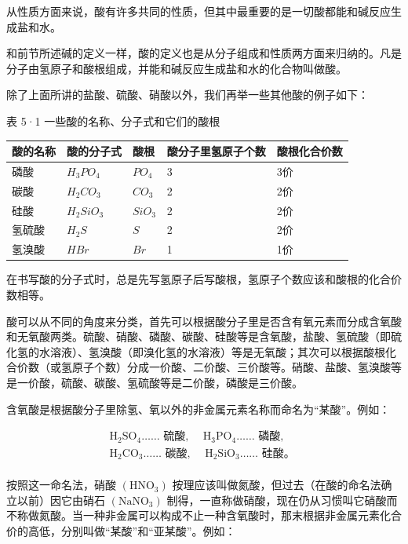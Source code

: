 从性质方面来说，酸有许多共同的性质，但其中最重要的是一切酸都能和碱反应生成盐和水。

和前节所述碱的定义一样，酸的定义也是从分子组成和性质两方面来归纳的。凡是分子由氢原子和酸根组成，并能和碱反应生成盐和水的化合物叫做酸。

除了上面所讲的盐酸、硫酸、硝酸以外，我们再举一些其他酸的例子如下：

表 5·1 一些酸的名称、分子式和它们的酸根

{\def\LTcaptype{none} %
\begin{longtable}[]{@{}lllll@{}}
\toprule\noalign{}
酸的名称 & 酸的分子式 & 酸根 & 酸分子里氢原子个数 & 酸根化合价数 \\
\midrule\noalign{}
\endhead
\bottomrule\noalign{}
\endlastfoot
磷酸 & \(H_3PO_4\) & \(PO_4\) & 3 & 3价 \\
碳酸 & \(H_2CO_3\) & \(CO_3\) & 2 & 2价 \\
硅酸 & \(H_2SiO_3\) & \(SiO_3\) & 2 & 2价 \\
氢硫酸 & \(H_2S\) & \(S\) & 2 & 2价 \\
氢溴酸 & \(HBr\) & \(Br\) & 1 & 1价 \\
\end{longtable}
}

在书写酸的分子式时，总是先写氢原子后写酸根，氢原子个数应该和酸根的化合价数相等。

酸可以从不同的角度来分类，首先可以根据酸分子里是否含有氧元素而分成含氧酸和无氧酸两类。硫酸、硝酸、磷酸、碳酸、硅酸等是含氧酸，盐酸、氢硫酸（即硫化氢的水溶液）、氢溴酸（即溴化氢的水溶液）等是无氧酸；其次可以根据酸根化合价数（或氢原子个数）分成一价酸、二价酸、三价酸等。硝酸、盐酸、氢溴酸等是一价酸，硫酸、碳酸、氢硫酸等是二价酸，磷酸是三价酸。

含氧酸是根据酸分子里除氢、氧以外的非金属元素名称而命名为``某酸''。例如：

\[
\begin{array}{l} \mathrm{H}_{2} \mathrm{SO}_{4} \dots \dots \text{ 硫酸, } \quad \mathrm{H}_{3} \mathrm{PO}_{4} \dots \dots \text{ 磷酸, } \\ \mathrm{H}_{2} \mathrm{CO}_{3} \dots \dots \text{ 碳酸, } \quad \mathrm{H}_{2} \mathrm{SiO}_{3} \dots \dots \text{ 硅酸。 } \\ \end{array}
\]

按照这一命名法，硝酸 \(\left(\mathrm{HNO}_{3}\right)\)
按理应该叫做氮酸，但过去（在酸的命名法确立以前）因它由硝石
\(\left(\mathrm{NaNO}_{3}\right)\)
制得，一直称做硝酸，现在仍从习惯叫它硝酸而不称做氮酸。当一种非金属可以构成不止一种含氧酸时，那末根据非金属元素化合价的高低，分别叫做``某酸''和``亚某酸''。例如：

